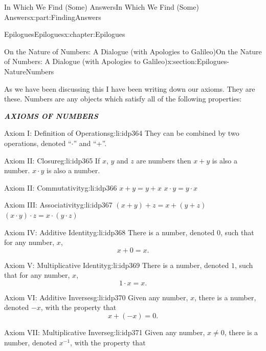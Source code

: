\documentclass[oneside,10pt,]{book}
\newcommand{\alert}[1]{\textbf{\textit{#1}}}
\numberwithin{equation}{section}
\begin{document}
\begin{partptx}{In Which We Find (Some) Answers}{}{In Which We Find (Some) Answers}{}{}{x:part:FindingAnswers}
\begin{chapterptx}{Epilogues}{}{Epilogues}{}{}{x:chapter:Epilogues}
\begin{sectionptx}{On the Nature of Numbers: A Dialogue (with Apologies to Galileo)}{}{On the Nature of Numbers: A Dialogue (with Apologies to Galileo)}{}{}{x:section:Epilogues-NatureNumbers}
\begin{introduction}{}
\par
As we have been discussing this I have been writing down our axioms.  They are these.  Numbers are any objects which satisfy all of the following properties:%
\par
\alert{AXIOMS OF NUMBERS}%
\par
%
\begin{descriptionlist}
\begin{dlimedium}{Axiom I: Definition of Operations}{g:li:idp364}%
They can be combined by two operations, denoted ``\(\cdot\)'' and ``+''.%
\end{dlimedium}%
\begin{dlimedium}{Axiom II: Closure}{g:li:idp365}%
If \(x\), \(y\) and \(z\) are numbers then \(x+y\) is also a number. \(x\cdot y\) is also a number.%
\end{dlimedium}%
\begin{dlimedium}{Axiom II: Commutativity}{g:li:idp366}%
\(x+y=y+x\) \(x\cdot y=y\cdot x\)%
\end{dlimedium}%
\begin{dlimedium}{Axiom III: Associativity}{g:li:idp367}%
\((x+y)+z=x+(y+z)\) \((x\cdot y)\cdot z = x\cdot(y\cdot z)\)%
\end{dlimedium}%
\begin{dlimedium}{Axiom IV: Additive Identity}{g:li:idp368}%
There is a number, denoted \(0\), such that for any number, \(x\),%
\begin{equation*}
x+0=x\text{.}
\end{equation*}
%
\end{dlimedium}%
\begin{dlimedium}{Axiom V: Multiplicative Identity}{g:li:idp369}%
There is a number, denoted \(1\), such that for any number, \(x\),%
\begin{equation*}
1\cdot x=x\text{.}
\end{equation*}
%
\end{dlimedium}%
\begin{dlimedium}{Axiom VI: Additive Inverses}{g:li:idp370}%
Given any number, \(x\), there is a number, denoted \(-x\), with the property that%
\begin{equation*}
x+(-x)=0\text{.}
\end{equation*}
%
\end{dlimedium}%
\begin{dlimedium}{Axiom VII: Multiplicative Inverse}{g:li:idp371}%
Given any number, \(x\ne0\), there is a number, denoted \(x^{-1}\), with the property that%
\begin{equation*}

\end{equation*}
\end{dlimedium}
\end{descriptionlist}
\end{introduction}
\end{sectionptx}
\end{chapterptx}
\end{partptx}
\end{document}
